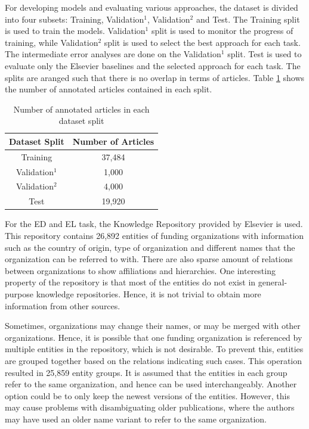 \documentclass{report}
\theoremstyle{definition}
\theoremstyle{remark}
\begin{document}
For developing models and evaluating various approaches, the dataset is divided into four subsets: Training, Validation$^{1}$, Validation$^{2}$ and Test. The Training split is used to train the models. Validation$^{1}$ split is used to monitor the progress of training, while Validation$^{2}$ split is used to select the best approach for each task. The intermediate error analyses are done on the Validation$^{1}$ split. Test is used to evaluate only the Elsevier baselines and the selected approach for each task. The splits are aranged such that there is no overlap in terms of articles. Table \ref{tab:goldstats} shows the number of annotated articles contained in each split.

\begin{table}[h!]
    \centering
    \begin{tabular}{c c}
    Dataset Split  & Number of Articles  \\
        \hline
    Training &  37,484\\
    Validation$^1$ & 1,000\\
    Validation$^2$ & 4,000\\
    Test & 19,920 \\
    \end{tabular}
    \caption{Number of annotated articles in each dataset split}
    \label{tab:goldstats}
\end{table}

For the ED and EL task, the Knowledge Repository provided by Elsevier is used. This repository contains 26,892 entities of funding organizations with information such as the country of origin, type of organization and different names that the organization can be referred to with. There are also sparse amount of relations between organizations to show affiliations and hierarchies. One interesting property of the repository is that most of the entities do not exist in general-purpose knowledge repositories. Hence, it is not trivial to obtain more information from other sources.

Sometimes, organizations may change their names, or may be merged with other organizations. Hence, it is possible that one funding organization is referenced by multiple entities in the repository, which is not desirable. To prevent this, entities are grouped together based on the relations indicating such cases. This operation resulted in 25,859 entity groups. It is assumed that the entities in each group refer to the same organization, and hence can be used interchangeably. Another option could be to only keep the newest versions of the entities. However, this may cause problems with disambiguating older publications, where the authors may have used an older name variant to refer to the same organization.
\end{document}
